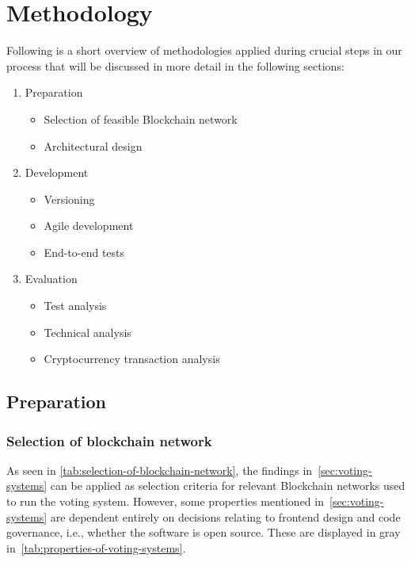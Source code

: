 \chapter{Methodology}\label{ch:methodology}

Following is a short overview of methodologies applied during crucial steps in our process that will be discussed in more detail in the following sections:

\begin{enumerate}
    \item Preparation
    \begin{itemize}
        \item Selection of feasible \gls{Blockchain} network
        \item Architectural design
    \end{itemize}
    \item Development
    \begin{itemize}
        \item Versioning
        \item Agile development
        \item End-to-end tests
    \end{itemize}
    \item Evaluation
    \begin{itemize}
        \item Test analysis
        \item Technical analysis
        \item Cryptocurrency transaction analysis
    \end{itemize}
\end{enumerate}

\section{Preparation}\label{sec:preparation}

\subsection{Selection of blockchain network}\label{subsec:selection-of-blockchain-network}

As seen in \cref{tab:selection-of-blockchain-network}, the findings in~\cref{sec:voting-systems} can be applied as selection criteria for relevant \gls{Blockchain} networks used to run the voting system.
However, some properties mentioned in~\cref{sec:voting-systems} are dependent entirely on decisions relating to frontend design and code governance, i.e., whether the software is open source.
These are displayed in gray in~\cref{tab:properties-of-voting-systems}.

